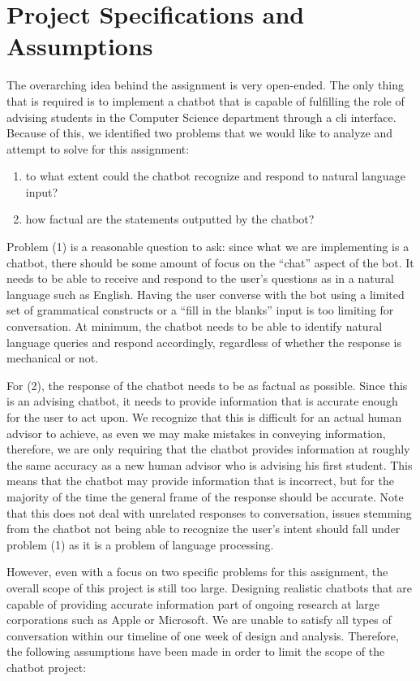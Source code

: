 \section{Project Specifications and Assumptions}

The overarching idea behind the assignment is very open-ended. The only thing
that is required is to implement a chatbot that is capable of fulfilling the
role of advising students in the Computer Science department through a cli
interface. Because of this, we identified two problems that we would like to
analyze and attempt to solve for this assignment:

\begin{enumerate}
\item to what extent could the chatbot recognize and respond to natural
language input?
\item how factual are the statements outputted by the chatbot?
\end{enumerate}

Problem (1) is a reasonable question to ask: since what we are implementing is a
chatbot, there should be some amount of focus on the ``chat'' aspect of the bot.
It needs to be able to receive and respond to the user's questions as in a
natural language such as English. Having the user converse with the bot using a
limited set of grammatical constructs or a ``fill in the blanks'' input is too
limiting for conversation. At minimum, the chatbot needs to be able to identify
natural language queries and respond accordingly, regardless of whether the
response is mechanical or not.

For (2), the response of the chatbot needs to be as factual as possible. Since
this is an advising chatbot, it needs to provide information that is accurate
enough for the user to act upon. We recognize that this is difficult for an
actual human advisor to achieve, as even we may make mistakes in conveying
information, therefore, we are only requiring that the chatbot provides
information at roughly the same accuracy as a new human advisor who is advising
his first student. This means that the chatbot may provide information that is
incorrect, but for the majority of the time the general frame of the response
should be accurate. Note that this does not deal with unrelated responses to
conversation, issues stemming from the chatbot not being able to recognize the
user's intent should fall under problem (1) as it is a problem of language
processing.

However, even with a focus on two specific problems for this assignment, the
overall scope of this project is still too large. Designing realistic chatbots
that are capable of providing accurate information part of ongoing research at
large corporations such as Apple or Microsoft. We are unable to satisfy all
types of conversation within our timeline of one week of design and analysis.
Therefore, the following assumptions have been made in order to limit the scope
of the chatbot project:

